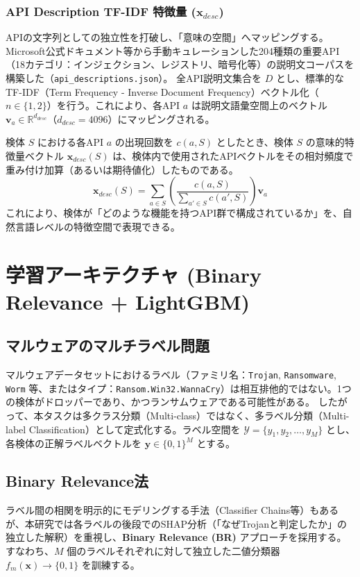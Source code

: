 \documentclass[11pt,a4paper,dvipdfmx]{article}
\begin{document}
\subsubsection{API Description TF-IDF 特徴量 ($\mathbf{x}_{desc}$)}
APIの文字列としての独立性を打破し、「意味の空間」へマッピングする。
Microsoft公式ドキュメント等から手動キュレーションした204種類の重要API（18カテゴリ：インジェクション、レジストリ、暗号化等）の説明文コーパスを構築した（\texttt{api\_descriptions.json}）。
全API説明文集合を $D$ とし、標準的な TF-IDF（Term Frequency - Inverse Document Frequency）ベクトル化（$n \in \{1, 2\}$）を行う。これにより、各API $a$ は説明文語彙空間上のベクトル $\mathbf{v}_a \in \mathbb{R}^{d_{desc}}$（$d_{desc} = 4096$）にマッピングされる。

検体 $S$ における各API $a$ の出現回数を $c(a, S)$ としたとき、検体 $S$ の意味的特徴量ベクトル $\mathbf{x}_{desc}(S)$ は、検体内で使用されたAPIベクトルをその相対頻度で重み付け加算（あるいは期待値化）したものである。
\begin{equation}
    \mathbf{x}_{desc}(S) = \sum_{a \in S} \left( \frac{c(a, S)}{\sum_{a' \in S} c(a', S)} \right) \mathbf{v}_a
\end{equation}
これにより、検体が「どのような機能を持つAPI群で構成されているか」を、自然言語レベルの特徴空間で表現できる。

\section{学習アーキテクチャ (Binary Relevance + LightGBM)}

\subsection{マルウェアのマルチラベル問題}
マルウェアデータセットにおけるラベル（ファミリ名：\texttt{Trojan}, \texttt{Ransomware}, \texttt{Worm} 等、またはタイプ：\texttt{Ransom.Win32.WannaCry}）は相互排他的ではない。1つの検体がドロッパーであり、かつランサムウェアである可能性がある。
したがって、本タスクは多クラス分類（Multi-class）ではなく、多ラベル分類（Multi-label Classification）として定式化する。ラベル空間を $\mathcal{Y} = \{y_1, y_2, \dots, y_M\}$ とし、各検体の正解ラベルベクトルを $\mathbf{y} \in \{0, 1\}^M$ とする。

\subsection{Binary Relevance法}
ラベル間の相関を明示的にモデリングする手法（Classifier Chains等）もあるが、本研究では各ラベルの後段でのSHAP分析（「なぜTrojanと判定したか」の独立した解釈）を重視し、\textbf{Binary Relevance (BR)} アプローチを採用する。
すなわち、$M$ 個のラベルそれぞれに対して独立した二値分類器 $f_m(\mathbf{x}) \rightarrow \{0, 1\}$ を訓練する。
\end{document}
